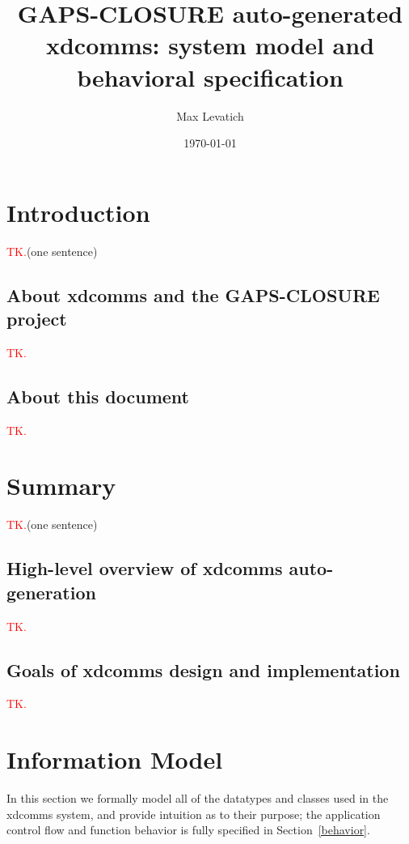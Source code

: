 \documentclass[11pt, oneside]{article}
\title{GAPS-CLOSURE auto-generated xdcomms: system model and behavioral specification}
\author{Max Levatich}
\date{\today}
\newcommand{\todo}{\textcolor{red}{TK.}}
\begin{document}
    \maketitle
    \tableofcontents

    \section{Introduction} \label{intro}

        \todo (one sentence)

        \subsection{About xdcomms and the GAPS-CLOSURE project}

            \todo

        \subsection{About this document}

            \todo

    \section{Summary}  \label{summary}

        \todo (one sentence)

        \subsection{High-level overview of xdcomms auto-generation}

            \todo

        \subsection{Goals of xdcomms design and implementation}

            \todo

    \section{Information Model} \label{imodel}

        In this section we formally model all of the datatypes and classes
        used in the xdcomms system, and provide intuition as to their purpose;
        the application control flow and function behavior is fully specified
        in Section~\ref{behavior}.
\end{document}
